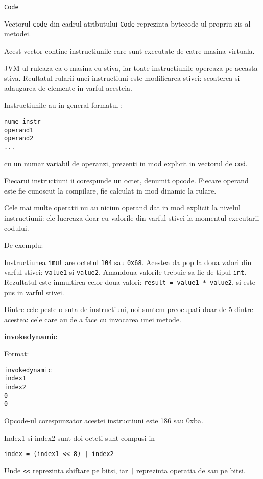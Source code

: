 \texttt{Code}

Vectorul \texttt{code} din cadrul atributului \texttt{Code} reprezinta
bytecode-ul propriu-zis al metodei.

Acest vector contine instructiunile care sunt executate de catre masina
virtuala.

JVM-ul ruleaza ca o masina cu stiva, iar toate instructiunile opereaza
pe aceasta stiva. Reultatul rularii unei instructiuni este modificarea
stivei: scoaterea si adaugarea de elemente in varful acesteia.

Instructiunile au in general formatul \cite{instruction_format}:

\begin{verbatim}
nume_instr
operand1
operand2
...
\end{verbatim}

cu un numar variabil de operanzi, prezenti in mod explicit in vectorul
de \texttt{cod}.

Fiecarui instructiuni ii corespunde un octet, denumit opcode. Fiecare
operand este fie cunoscut la compilare, fie calculat in mod dinamic la
rulare.

Cele mai multe operatii nu au niciun operand dat in mod explicit la
nivelul instructiunii: ele lucreaza doar cu valorile din varful stivei
la momentul executarii codului.

De exemplu:

Instructiunea \texttt{imul} are octetul \texttt{104} sau \texttt{0x68}.
Acestea da pop la doua valori din varful stivei: \texttt{value1} si
\texttt{value2}. Amandoua valorile trebuie sa fie de tipul \texttt{int}.
Rezultatul este inmultirea celor doua valori:
\texttt{result\ =\ value1\ *\ value2}, si este pus in varful stivei.

Dintre cele peste o suta de instructiuni, noi suntem preocupati doar de
5 dintre acestea: cele care au de a face cu invocarea unei metode.

\textbf{invokedynamic}

Format:

\begin{verbatim}
invokedynamic
index1
index2
0
0
\end{verbatim}

Opcode-ul corespunzator acestei instructiuni este 186 sau
0xba.

Index1 si index2 sunt doi octeti sunt compusi in
\begin{lstlisting}
index = (index1 << 8) | index2
\end{lstlisting}
Unde \texttt{<<} reprezinta shiftare pe bitsi, iar \texttt{|} reprezinta operatia de sau pe bitsi.

